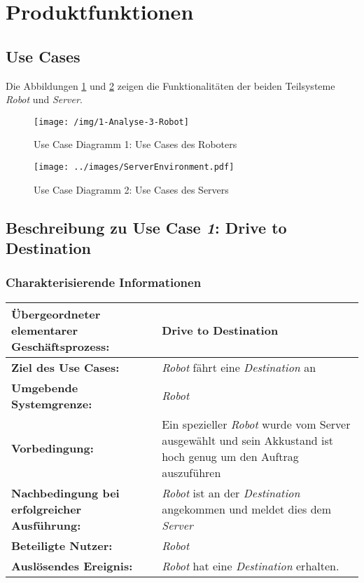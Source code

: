 \section{Produktfunktionen}

		\subsection{Use Cases}
		
		Die Abbildungen \ref{fig:3-1-robot-use-cases} und \ref{fig:3-1-server-use-cases} zeigen die Funktionalitäten der beiden Teilsysteme \emph{Robot} und \emph{Server}.
		
			\begin{figure}[H]
				\centering
				\texttt{[image: /img/1-Analyse-3-Robot]}
				\caption{Use Case Diagramm 1: Use Cases des Roboters}
				\label{fig:3-1-robot-use-cases}
			\end{figure}

			\begin{figure}[H]
				\centering
				\texttt{[image: ../images/ServerEnvironment.pdf]}
				\caption{Use Case Diagramm 2: Use Cases des Servers}
				\label{fig:3-1-server-use-cases}
			\end{figure}


		\pagebreak

		\subsection{Beschreibung zu Use Case \emph{1}: Drive to Destination}

			\subsubsection*{Charakterisierende Informationen}

			\begin{table}[H]
				\centering
				\begin{tabularx}{\textwidth}{@{}p{5cm}X@{}}
				\toprule
				\textbf{Übergeordneter elementarer Geschäftsprozess:} & Drive to Destination\\ \midrule
				\textbf{Ziel des Use Cases:} & \emph{Robot} fährt eine \emph{Destination} an\\ \midrule
				\textbf{Umgebende Systemgrenze:} & \emph{Robot} \\ \midrule
				\textbf{Vorbedingung:} & Ein spezieller \emph{Robot} wurde vom Server ausgewählt und sein Akkustand ist hoch genug um den Auftrag auszuführen \\ \midrule
				\textbf{Nachbedingung bei erfolgreicher Ausführung:} & \emph{Robot} ist an der \emph{Destination} angekommen und meldet dies dem \emph{Server} \\ \midrule
				\textbf{Beteiligte Nutzer:} & \emph{Robot} \\ \midrule
				\textbf{Auslösendes Ereignis:} & \emph{Robot} hat eine \emph{Destination} erhalten. \\
				\bottomrule
				\end{tabularx}
			\end{table}

